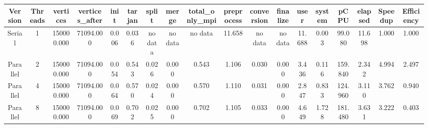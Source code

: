 \begin{tabular}{|c|c|c|c|c|c|c|c|c|c|c|c|c|c|c|c|c|c|}
\toprule
 Version &  Threads &   vertices &  vertices\_after &  init &  tarjan &   split &   merge & total\_only\_mpi &  preprocess & conversion & finalize &   user &  system &    pCPU &  elapsed &  Speedup &  Efficiency \\
\midrule
  Serial &        1 & 150000.000 &       71094.000 & 0.006 &   0.036 & no data & no data &        no data &      11.658 &    no data &  no data & 11.688 &   0.003 &  99.080 &   11.698 &    1.000 &       1.000 \\
Parallel &        2 & 150000.000 &       71094.000 & 0.054 &   0.543 &   0.026 &   0.000 &          0.543 &       1.106 &      0.030 &    0.000 &  3.436 &   0.116 & 159.840 &    2.342 &    4.994 &       2.497 \\
Parallel &        4 & 150000.000 &       71094.000 & 0.064 &   0.570 &   0.024 &   0.000 &          0.570 &       1.110 &      0.031 &    0.000 &  2.847 &   0.833 & 124.960 &    3.110 &    3.762 &       0.940 \\
Parallel &        8 & 150000.000 &       71094.000 & 0.069 &   0.702 &   0.025 &   0.000 &          0.702 &       1.105 &      0.033 &    0.000 &  4.649 &   1.728 & 181.480 &    3.631 &    3.222 &       0.403 \\
\bottomrule
\end{tabular}
